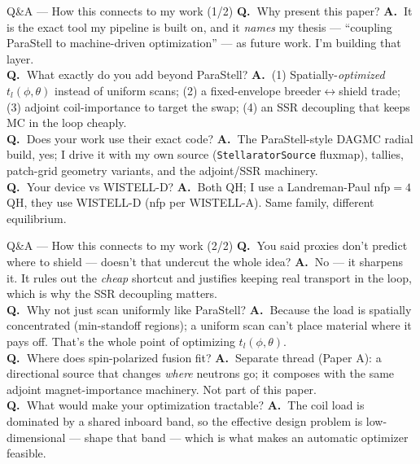 \documentclass[aspectratio=169]{beamer}
\newcommand{\q}[1]{\textbf{\color{key}Q.\ }#1}
\newcommand{\an}[1]{\textbf{A.\ }#1}
\begin{document}
\begin{frame}{Q\&A --- How this connects to my work (1/2)}
  \small
  \q{Why present this paper?} \an{It is the exact tool my pipeline is built on, and it \emph{names} my thesis --- ``coupling ParaStell to machine-driven optimization'' --- as future work. I'm building that layer.}\\[2pt]
  \q{What exactly do you add beyond ParaStell?} \an{(1) Spatially-\emph{optimized} $t_l(\phi,\theta)$ instead of uniform scans; (2) a fixed-envelope breeder$\leftrightarrow$shield trade; (3) adjoint coil-importance to target the swap; (4) an SSR decoupling that keeps MC in the loop cheaply.}\\[2pt]
  \q{Does your work use their exact code?} \an{The ParaStell-style DAGMC radial build, yes; I drive it with my own source (\texttt{StellaratorSource} fluxmap), tallies, patch-grid geometry variants, and the adjoint/SSR machinery.}\\[2pt]
  \q{Your device vs WISTELL-D?} \an{Both QH; I use a Landreman-Paul nfp$=4$ QH, they use WISTELL-D (nfp per WISTELL-A). Same family, different equilibrium.}
\end{frame}

\begin{frame}{Q\&A --- How this connects to my work (2/2)}
  \small
  \q{You said proxies don't predict where to shield --- doesn't that undercut the whole idea?} \an{No --- it sharpens it. It rules out the \emph{cheap} shortcut and justifies keeping real transport in the loop, which is why the SSR decoupling matters.}\\[2pt]
  \q{Why not just scan uniformly like ParaStell?} \an{Because the load is spatially concentrated (min-standoff regions); a uniform scan can't place material where it pays off. That's the whole point of optimizing $t_l(\phi,\theta)$.}\\[2pt]
  \q{Where does spin-polarized fusion fit?} \an{Separate thread (Paper A): a directional source that changes \emph{where} neutrons go; it composes with the same adjoint magnet-importance machinery. Not part of this paper.}\\[2pt]
  \q{What would make your optimization tractable?} \an{The coil load is dominated by a shared inboard band, so the effective design problem is low-dimensional --- shape that band --- which is what makes an automatic optimizer feasible.}
\end{frame}
\end{document}
